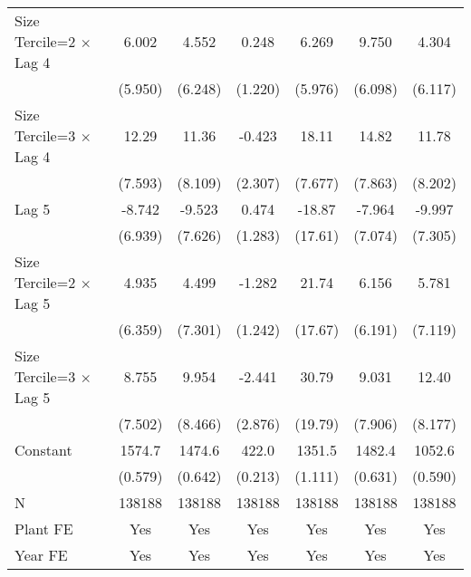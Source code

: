 \begin{table}[htbp]
\begin{tabular}{l*{6}{c}}
\addlinespace
Size Tercile=2 $\times$ Lag 4&    6.002         &    4.552         &    0.248         &    6.269         &    9.750         &    4.304         \\
                &  (5.950)         &  (6.248)         &  (1.220)         &  (5.976)         &  (6.098)         &  (6.117)         \\
\addlinespace
Size Tercile=3 $\times$ Lag 4&    12.29         &    11.36         &   -0.423         &    18.11\sym{*}  &    14.82         &    11.78         \\
                &  (7.593)         &  (8.109)         &  (2.307)         &  (7.677)         &  (7.863)         &  (8.202)         \\
\addlinespace
Lag 5           &   -8.742         &   -9.523         &    0.474         &   -18.87         &   -7.964         &   -9.997         \\
                &  (6.939)         &  (7.626)         &  (1.283)         &  (17.61)         &  (7.074)         &  (7.305)         \\
\addlinespace
Size Tercile=2 $\times$ Lag 5&    4.935         &    4.499         &   -1.282         &    21.74         &    6.156         &    5.781         \\
                &  (6.359)         &  (7.301)         &  (1.242)         &  (17.67)         &  (6.191)         &  (7.119)         \\
\addlinespace
Size Tercile=3 $\times$ Lag 5&    8.755         &    9.954         &   -2.441         &    30.79         &    9.031         &    12.40         \\
                &  (7.502)         &  (8.466)         &  (2.876)         &  (19.79)         &  (7.906)         &  (8.177)         \\
\addlinespace
Constant        &   1574.7\sym{***}&   1474.6\sym{***}&    422.0\sym{***}&   1351.5\sym{***}&   1482.4\sym{***}&   1052.6\sym{***}\\
                &  (0.579)         &  (0.642)         &  (0.213)         &  (1.111)         &  (0.631)         &  (0.590)         \\
\midrule
N               &   138188         &   138188         &   138188         &   138188         &   138188         &   138188         \\
Plant FE        &      Yes         &      Yes         &      Yes         &      Yes         &      Yes         &      Yes         \\
Year FE         &      Yes         &      Yes         &      Yes         &      Yes         &      Yes         &      Yes         \\

\end{tabular}
\end{table}
